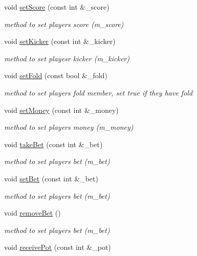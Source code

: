 \begin{DoxyCompactItemize}
void \hyperlink{classplayer_a03776f08d7790746b174e4d39e02fd3d}{set\-Score} (const int \&\-\_\-score)
\begin{DoxyCompactList}\small\item\em method to set players score (m\-\_\-score) \end{DoxyCompactList}\item 
void \hyperlink{classplayer_a8b8eccf07f1b5e335dde68858c09dd86}{set\-Kicker} (const int \&\-\_\-kicker)
\begin{DoxyCompactList}\small\item\em method to set playesr kicker (m\-\_\-kicker) \end{DoxyCompactList}\item 
void \hyperlink{classplayer_a16a84dc7bb2aefb88569ffcded5a49b8}{set\-Fold} (const bool \&\-\_\-fold)
\begin{DoxyCompactList}\small\item\em method to set players fold member, set true if they have fold \end{DoxyCompactList}\item 
void \hyperlink{classplayer_a9ed74ecf489c4e477cdc6a7e466a9bcb}{set\-Money} (const int \&\-\_\-money)
\begin{DoxyCompactList}\small\item\em method to set players money (m\-\_\-money) \end{DoxyCompactList}\item 
void \hyperlink{classplayer_ab982aaee95ec09f05828268b1eb5f7ea}{take\-Bet} (const int \&\-\_\-bet)
\begin{DoxyCompactList}\small\item\em method to set players bet (m\-\_\-bet) \end{DoxyCompactList}\item 
void \hyperlink{classplayer_a6cbe2def15e91150ee02b830f6d5100c}{set\-Bet} (const int \&\-\_\-bet)
\begin{DoxyCompactList}\small\item\em method to set players bet (m\-\_\-bet) \end{DoxyCompactList}\item 
void \hyperlink{classplayer_a36309336bf0bb870f6889f788975d016}{remove\-Bet} ()
\begin{DoxyCompactList}\small\item\em method to set players bet (m\-\_\-bet) \end{DoxyCompactList}\item 
void \hyperlink{classplayer_ac136c0a01decf0c01919d4ccf5b9d26f}{receive\-Pot} (const int \&\-\_\-pot)

\end{DoxyCompactItemize}
